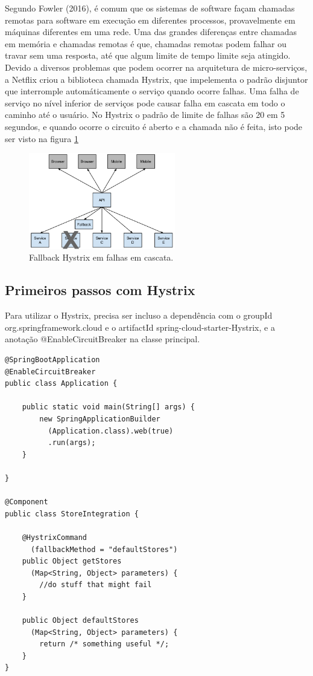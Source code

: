 \documentclass[journal]{IEEEtran}
\begin{document}
Segundo Fowler (2016), é comum que os sistemas de software façam chamadas remotas para software em execução em diferentes processos, provavelmente em máquinas diferentes em uma rede. Uma das grandes diferenças entre chamadas em memória e chamadas remotas é que, chamadas remotas podem falhar ou travar sem uma resposta, até que algum limite de tempo limite seja atingido. Devido a diversos problemas que podem ocorrer na arquitetura de micro-serviços, a Netflix criou a biblioteca chamada Hystrix, que impelementa o padrão disjuntor que interromple automáticamente o serviço quando ocorre falhas. Uma falha de serviço no nível inferior de serviços pode causar falha em cascata em todo o caminho até o usuário. No Hystrix o padrão de limite de falhas são 20 em 5 segundos, e quando ocorre o circuito é aberto e a chamada não é feita, isto pode ser visto na figura \ref{fig:figura7}

\begin{figure}[h]
\centering
\includegraphics[height=4.2cm]{figura7}
\caption{Fallback Hystrix em falhas em cascata.}
\label{fig:figura7}
\end{figure}

\subsection{Primeiros passos com Hystrix}

Para utilizar o Hystrix, precisa ser incluso a dependência com o groupId org.springframework.cloud e o artifactId spring-cloud-starter-Hystrix, e a anotação @EnableCircuitBreaker na classe principal.

\begin{verbatim}
@SpringBootApplication
@EnableCircuitBreaker
public class Application {

    public static void main(String[] args) {
        new SpringApplicationBuilder
          (Application.class).web(true)
          .run(args);
    }

}

@Component
public class StoreIntegration {

    @HystrixCommand
      (fallbackMethod = "defaultStores")
    public Object getStores
      (Map<String, Object> parameters) {
        //do stuff that might fail
    }

    public Object defaultStores
      (Map<String, Object> parameters) {
        return /* something useful */;
    }
}
\end{verbatim}
\end{document}
